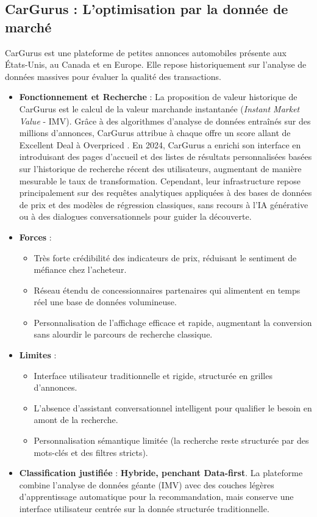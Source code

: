 \documentclass[11pt,a4paper]{article}
\begin{document}
\subsection{CarGurus : L'optimisation par la donnée de marché}
CarGurus est une plateforme de petites annonces automobiles présente aux États-Unis, au Canada et en Europe. Elle repose historiquement sur l'analyse de données massives pour évaluer la qualité des transactions.

\begin{itemize}
    \item \textbf{Fonctionnement et Recherche} : La proposition de valeur historique de CarGurus est le calcul de la valeur marchande instantanée (\textit{Instant Market Value} - IMV). Grâce à des algorithmes d'analyse de données entraînés sur des millions d'annonces, CarGurus attribue à chaque offre un score allant de \og Excellent Deal \fg à \og Overpriced \fg. En 2024, CarGurus a enrichi son interface en introduisant des pages d'accueil et des listes de résultats personnalisées basées sur l'historique de recherche récent des utilisateurs, augmentant de manière mesurable le taux de transformation. Cependant, leur infrastructure repose principalement sur des requêtes analytiques appliquées à des bases de données de prix et des modèles de régression classiques, sans recours à l'IA générative ou à des dialogues conversationnels pour guider la découverte.
    \item \textbf{Forces} :
    \begin{itemize}
        \item Très forte crédibilité des indicateurs de prix, réduisant le sentiment de méfiance chez l'acheteur.
        \item Réseau étendu de concessionnaires partenaires qui alimentent en temps réel une base de données volumineuse.
        \item Personnalisation de l'affichage efficace et rapide, augmentant la conversion sans alourdir le parcours de recherche classique.
    \end{itemize}
    \item \textbf{Limites} :
    \begin{itemize}
        \item Interface utilisateur traditionnelle et rigide, structurée en grilles d'annonces.
        \item L'absence d'assistant conversationnel intelligent pour qualifier le besoin en amont de la recherche.
        \item Personnalisation sémantique limitée (la recherche reste structurée par des mots-clés et des filtres stricts).
    \end{itemize}
    \item \textbf{Classification justifiée} : \textbf{Hybride, penchant Data-first}. La plateforme combine l'analyse de données géante (IMV) avec des couches légères d'apprentissage automatique pour la recommandation, mais conserve une interface utilisateur centrée sur la donnée structurée traditionnelle.
\end{itemize}
\end{document}
